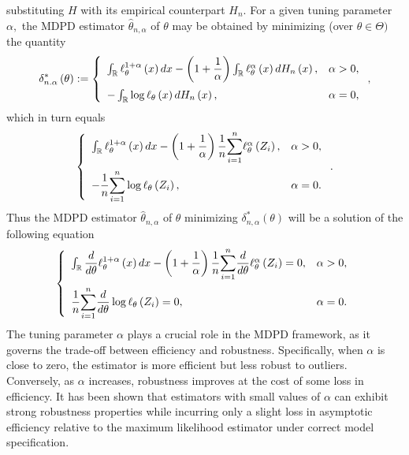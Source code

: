 \documentclass[12pt,reqno,openbib,runningheads,a4paper,portrait]{amsart}%
\begin{document}
substituting $H$ with its empirical counterpart $H_{n}.$ For a given tuning
parameter $\alpha,$ the MDPD estimator $\widehat{\theta}_{n,\alpha}$ of
$\theta$ may be obtained by minimizing (over $\theta\in\Theta)$ the quantity%
\[
\delta_{n.\alpha}^{\ast}\left(  \theta\right)  :=\left\{
\begin{array}
[c]{lc}%
\int_{\mathbb{R}}\ell_{\theta}^{1+\alpha}\left(  x\right)  dx-\left(
1+\dfrac{1}{\alpha}\right)  \int_{\mathbb{R}}\ell_{\theta}^{\alpha}\left(
x\right)  dH_{n}\left(  x\right)  , & \alpha>0,\medskip\\
-\int_{\mathbb{R}}\log\ell_{\theta}\left(  x\right)  dH_{n}\left(  x\right)
, & \alpha=0,
\end{array}
\right.  ,
\]
which in turn equals
\[
\left\{
\begin{array}
[c]{lc}%
\int_{\mathbb{R}}\ell_{\theta}^{1+\alpha}\left(  x\right)  dx-\left(
1+\dfrac{1}{\alpha}\right)  \dfrac{1}{n}%
{\displaystyle\sum\limits_{i=1}^{n}}
\ell_{\theta}^{\alpha}\left(  Z_{i}\right)  , & \alpha>0,\medskip\\
-\dfrac{1}{n}%
{\displaystyle\sum\limits_{i=1}^{n}}
\log\ell_{\theta}\left(  Z_{i}\right)  , & \alpha=0.
\end{array}
\right.  .
\]
Thus the MDPD estimator $\widehat{\theta}_{n,\alpha}$ of $\theta$ minimizing
$\delta_{n,\alpha}^{\ast}\left(  \theta\right)  $ will be a solution of the
following equation
\[
\left\{
\begin{array}
[c]{lc}%
\int_{\mathbb{R}}\dfrac{d}{d\theta}\ell_{\theta}^{1+\alpha}\left(  x\right)
dx-\left(  1+\dfrac{1}{\alpha}\right)  \dfrac{1}{n}%
{\displaystyle\sum\limits_{i=1}^{n}}
\dfrac{d}{d\theta}\ell_{\theta}^{\alpha}\left(  Z_{i}\right)  =0, &
\alpha>0,\medskip\\
\dfrac{1}{n}%
{\displaystyle\sum\limits_{i=1}^{n}}
\dfrac{d}{d\theta}\log\ell_{\theta}\left(  Z_{i}\right)  =0, & \alpha=0.
\end{array}
\right.
\]
The tuning parameter $\alpha$ plays a crucial role in the MDPD framework, as
it governs the trade-off between efficiency and robustness. Specifically, when
$\alpha$ is close to zero, the estimator is more efficient but less robust to
outliers. Conversely, as $\alpha$ increases, robustness improves at the cost
of some loss in efficiency. It has been shown that estimators with small
values of $\alpha$ can exhibit strong robustness properties while incurring
only a slight loss in asymptotic efficiency relative to the maximum likelihood
estimator under correct model specification.
\end{document}
